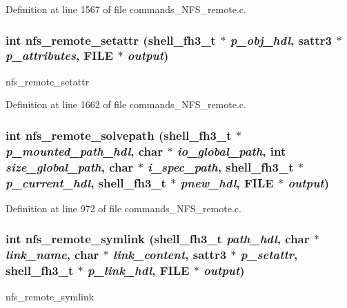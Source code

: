 Definition at line 1567 of file commands\_\-NFS\_\-remote.c.
\subsubsection[{nfs\_\-remote\_\-setattr}]{\setlength{\rightskip}{0pt plus 5cm}int nfs\_\-remote\_\-setattr ({\bf shell\_\-fh3\_\-t} $\ast$ {\em p\_\-obj\_\-hdl}, \/  sattr3 $\ast$ {\em p\_\-attributes}, \/  FILE $\ast$ {\em output})}\label{commands__NFS__remote_8c_a3fd856322c5a8ab02a65b61eb1771e5a}
nfs\_\-remote\_\-setattr 

Definition at line 1662 of file commands\_\-NFS\_\-remote.c.
\subsubsection[{nfs\_\-remote\_\-solvepath}]{\setlength{\rightskip}{0pt plus 5cm}int nfs\_\-remote\_\-solvepath ({\bf shell\_\-fh3\_\-t} $\ast$ {\em p\_\-mounted\_\-path\_\-hdl}, \/  char $\ast$ {\em io\_\-global\_\-path}, \/  int {\em size\_\-global\_\-path}, \/  char $\ast$ {\em i\_\-spec\_\-path}, \/  {\bf shell\_\-fh3\_\-t} $\ast$ {\em p\_\-current\_\-hdl}, \/  {\bf shell\_\-fh3\_\-t} $\ast$ {\em pnew\_\-hdl}, \/  FILE $\ast$ {\em output})}\label{commands__NFS__remote_8c_aaec76de1bc9fca9dd6d8661e5d132b4c}


Definition at line 972 of file commands\_\-NFS\_\-remote.c.
\subsubsection[{nfs\_\-remote\_\-symlink}]{\setlength{\rightskip}{0pt plus 5cm}int nfs\_\-remote\_\-symlink ({\bf shell\_\-fh3\_\-t} {\em path\_\-hdl}, \/  char $\ast$ {\em link\_\-name}, \/  char $\ast$ {\em link\_\-content}, \/  sattr3 $\ast$ {\em p\_\-setattr}, \/  {\bf shell\_\-fh3\_\-t} $\ast$ {\em p\_\-link\_\-hdl}, \/  FILE $\ast$ {\em output})}\label{commands__NFS__remote_8c_a1b8e00105d4699f52d15b3f241480a62}
nfs\_\-remote\_\-symlink 

